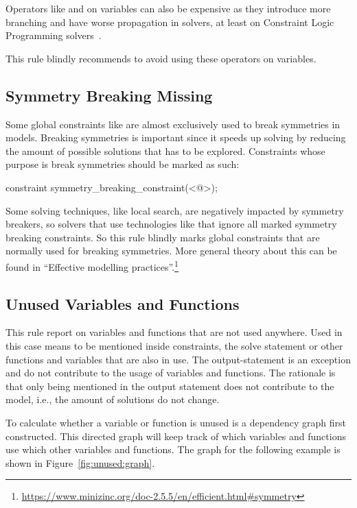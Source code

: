 \documentclass[a4paper,12pt]{article}
\begin{document}
Operators like \mi{\\/} and \mi{->} on variables can also be expensive as they introduce
more branching and have worse propagation in solvers, at least on Constraint Logic
Programming solvers~\cite[p.~430]{constraintshandbook}.

This rule blindly recommends to avoid using these operators on variables.

\subsection{Symmetry Breaking Missing}\label{sec:rule:symbreak}
Some global constraints like  are almost exclusively used to break
symmetries in models. Breaking symmetries is important since it speeds up solving by
reducing the amount of possible solutions that has to be explored. Constraints whose
purpose is break symmetries should be marked as such:
\begin{mznnobreak}
constraint symmetry_breaking_constraint(<@\dots@>);
\end{mznnobreak}
Some solving techniques, like local search, are negatively impacted
by symmetry breakers, so solvers that use technologies like that ignore all marked
symmetry breaking constraints. So this rule blindly marks global constraints that are
normally used for breaking symmetries. More general theory about this can be found in
``Effective modelling practices''.\footnote{\url{https://www.minizinc.org/doc-2.5.5/en/efficient.html\#symmetry}}

\subsection{Unused Variables and Functions}\label{sec:rule:unused}
This rule report on variables and functions that are not used anywhere.
Used in this case means to be mentioned inside constraints, the solve statement or other
functions and variables that are also in use. The output-statement is an exception and
do not contribute to the usage of variables and functions. The rationale is that only being
mentioned in the output statement does not contribute to the model, i.e., the amount of
solutions do not change.

To calculate whether a variable or function is unused is a dependency graph first
constructed. This directed graph will keep track of which variables and functions use
which other variables and functions. The graph for the following example is shown in
Figure~\ref{fig:unused:graph}.
\end{document}
